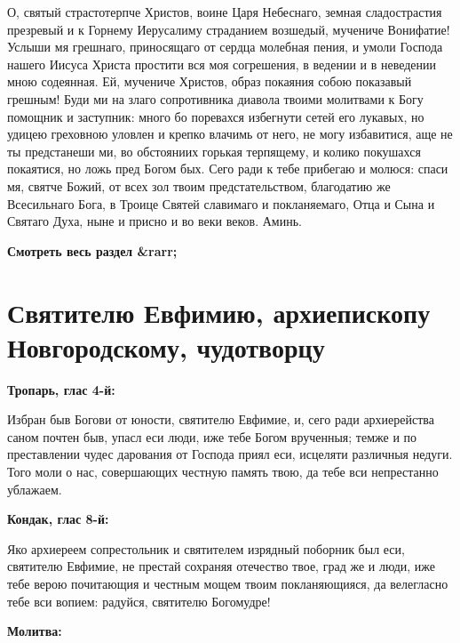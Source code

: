 О, святый страстотерпче Христов, воине Царя Небеснаго, земная сладострастия презревый и к Горнему Иерусалиму страданием возшедый, мучениче Вонифатие! Услыши мя грешнаго, приносящаго от сердца молебная пения, и умоли Господа нашего Иисуса Христа простити вся моя согрешения, в ведении и в неведении мною содеянная. Ей, мучениче Христов, образ покаяния собою показавый грешным! Буди ми на злаго сопротивника диавола твоими молитвами к Богу помощник и заступник: много бо поревахся избегнути сетей его лукавых, но удицею греховною уловлен и крепко влачимь от него, не могу избавитися, аще не ты предстанеши ми, во обстояниих горькая терпящему, и колико покушахся покаятися, но ложь пред Богом бых. Сего ради к тебе прибегаю и молюся: спаси мя, святче Божий, от всех зол твоим предстательством, благодатию же Всесильнаго Бога, в Троице Святей славимаго и покланяемаго, Отца и Сына и Святаго Духа, ныне и присно и во веки веков. Аминь. 


\mychapterending


\bfseries Смотреть весь раздел &rarr;\normalfont{} 

\section{Святителю Евфимию, архиепископу Новгородскому, чудотворцу}
 


\bfseries Тропарь, глас 4-й:\normalfont{}


Избран быв Богови от юности, святителю Евфимие, и, сего ради архиерейства саном почтен быв, упасл еси люди, иже тебе Богом врученныя; темже и по преставлении чудес дарования от Господа приял еси, исцеляти различныя недуги. Того моли о нас, совершающих честную память твою, да тебе вси непрестанно ублажаем.


\medskip


\bfseries Кондак, глас 8-й:\normalfont{}


Яко архиереем сопрестольник и святителем изрядный поборник был еси, святителю Евфимие, не престай сохраняя отечество твое, град же и люди, иже тебе верою почитающия и честным мощем твоим покланяющияся, да велегласно тебе вси вопием: радуйся, святителю Богомудре!


\medskip


\bfseries Молитва:\normalfont{}


